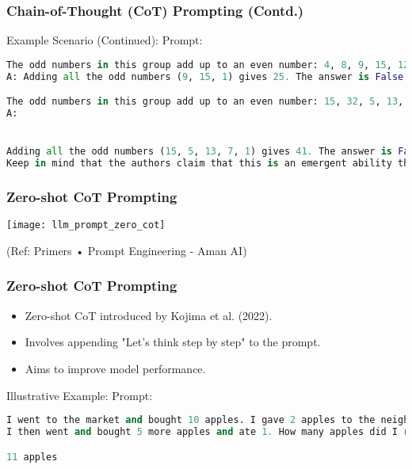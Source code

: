\begin{frame}[fragile]\frametitle{Chain-of-Thought (CoT) Prompting (Contd.)}

Example Scenario (Continued): Prompt:



\begin{lstlisting}[language=python]
The odd numbers in this group add up to an even number: 4, 8, 9, 15, 12, 2, 1.
A: Adding all the odd numbers (9, 15, 1) gives 25. The answer is False.

The odd numbers in this group add up to an even number: 15, 32, 5, 13, 82, 7, 1. 
A:


Adding all the odd numbers (15, 5, 13, 7, 1) gives 41. The answer is False.
Keep in mind that the authors claim that this is an emergent ability that arises with sufficiently large language models.
\end{lstlisting}


\end{frame}


\begin{frame}[fragile]\frametitle{Zero-shot CoT Prompting}


\begin{center}
\texttt{[image: llm\_prompt\_zero\_cot]}

{\tiny (Ref: Primers • Prompt Engineering - Aman AI)}

\end{center}				
			

\end{frame}

\begin{frame}[fragile]\frametitle{Zero-shot CoT Prompting}



    \begin{itemize}
      \item Zero-shot CoT introduced by Kojima et al. (2022).
      \item Involves appending "Let's think step by step" to the prompt.
      \item Aims to improve model performance.
    \end{itemize}

Illustrative Example: Prompt:
\begin{lstlisting}[language=python]
I went to the market and bought 10 apples. I gave 2 apples to the neighbor and 2 to the repairman.
I then went and bought 5 more apples and ate 1. How many apples did I remain with?

11 apples
\end{lstlisting}


\end{frame}


